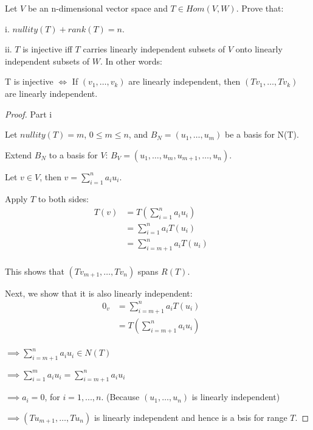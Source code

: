 \documentclass{article}
\newenvironment{customthm}[1]
  {\renewcommand\theinnercustomthm{#1}\innercustomthm}
  {\endinnercustomthm}
\begin{document}
\begin{customthm}{6}[2023.S(1.B), 2022.S(1.A.ii)]
  $ $

  Let $V$ be an n-dimensional vector space and $T \in Hom(V, W)$. Prove that:

  i. $nullity(T) + rank(T) = n$.

  ii. $T$ is injective iff $T$ carries linearly independent subsets of $V$ onto linearly independent subsets of $W$. In other words:

  T is injective $\iff$ If $(v_1,\ldots,v_k)$ are linearly independent, then $(Tv_1,\ldots,Tv_k)$ are linearly independent.

\end{customthm}

\begin{proof}{Part i}
  $ $

  Let $nullity(T) = m$, $0 \leq m \leq n$,  and $B_N = (u_1,\ldots,u_m)$ be a basis for N(T).
  \newline

  Extend $B_N$ to a basis for $V$: $B_V=(u_1,\ldots,u_m,u_{m+1},\ldots,u_n)$.
  \newline

  Let $v \in V$, then $v = \sum_{i=1}^{n} a_i u_i$.

  Apply $T$ to both sides:
  \begin{align*}
    T(v) &= T(\sum_{i=1}^{n} a_i u_i) &&\\
    &= \sum_{i=1}^{n} a_i T(u_i) &&\\
    &= \sum_{i=m+1}^{n} a_i T(u_i) &&\\
  \end{align*}

  This shows that $(Tv_{m+1},\ldots, Tv_n)$ spans $R(T)$.

  Next, we show that it is also linearly independent:
  \begin{align*}
    0_v &= \sum_{i=m+1}^{n} a_i T(u_i) &&\\
    &= T(\sum_{i=m+1}^{n} a_i u_i) &&\\
  \end{align*}

  \noindent
  $\implies \sum_{i=m+1}^{n} a_i u_i \in N(T)$

  \noindent
  $\implies \sum_{i=1}^{m} a_i u_i = \sum_{i=m+1}^{n} a_i u_i$

  \noindent
  $\implies a_i = 0$, for $i=1,...,n$. \qquad (Because $(u_1,\ldots,u_n)$ is linearly independent)

  \noindent
  $\implies (Tu_{m+1},\ldots,Tu_n)$ is linearly independent and hence is a bsis for range $T$.

\end{proof}
\end{document}
